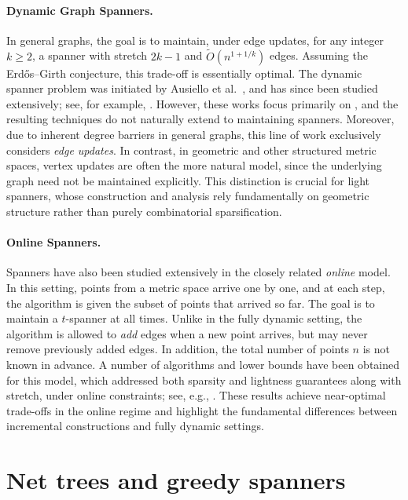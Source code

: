 \documentclass[11pt]{article}
\begin{document}
\paragraph*{Dynamic Graph Spanners.}
In general graphs, the goal is to maintain, under edge updates, for any integer $k \ge 2$, a spanner with stretch $2k - 1$ and $\widetilde{O}(n^{1+1/k})$ edges. Assuming the Erd\H{o}s--Girth conjecture, this trade-off is essentially optimal. The dynamic spanner problem was initiated by Ausiello et al.~\cite{ausiello2005small}, and has since been studied extensively; see, for example,
\cite{baswana2012fully, bodwin2016fully, elkin2011streaming, bernstein2021deamortization, forster2019dynamic}.
However, these works focus primarily on , and the resulting techniques do not naturally extend to maintaining  spanners.
Moreover, due to inherent degree barriers in general graphs, this line of work exclusively considers \emph{edge updates}.
In contrast, in geometric and other structured metric spaces, vertex updates are often the more natural model, since the underlying graph need not be maintained explicitly.
This distinction is crucial for light spanners, whose construction and analysis rely fundamentally on geometric structure rather than purely combinatorial sparsification.

\paragraph*{Online Spanners.}
Spanners have also been studied extensively in the closely related \emph{online} model.
In this setting, points from a metric space arrive one by one, and at each step, the algorithm is given the subset of points that arrived so far.
The goal is to maintain a $t$-spanner at all times. Unlike in the fully dynamic setting, the algorithm is allowed to \emph{add} edges when a new point arrives, but may never remove previously added edges.
In addition, the total number of points $n$ is not known in advance. A number of algorithms and lower bounds have been obtained for this model, which addressed both sparsity and lightness guarantees along with stretch, under online constraints; see, e.g.,
\cite{BhoreFKT24, BhoreT25, AlonAABN06, AlonA92, BermanC97, HajiaghayiLP17, NaorPS11}.
These results achieve near-optimal trade-offs in the online regime and highlight the fundamental differences between incremental constructions and fully dynamic settings. 



\section{Net trees and greedy spanners}\label{sec:NetTreesGreedySpanner}
\end{document}
